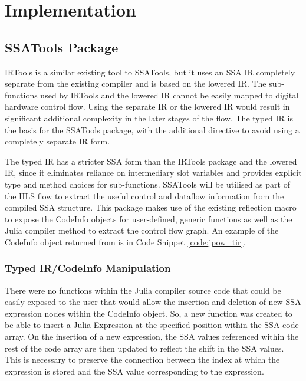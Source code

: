 \chapter{Implementation}

\section{SSATools Package}
IRTools \cite{julia_irtools} is a similar existing tool to SSATools, but it uses an SSA IR completely separate from the existing compiler and is based on the lowered IR. The sub-functions used by IRTools and the lowered IR cannot be easily mapped to digital hardware control flow. Using the separate IR or the lowered IR would result in significant additional complexity in the later stages of the flow. The typed IR is the basis for the SSATools package, with the additional directive to avoid using a completely separate IR form.

The typed IR has a stricter SSA form than the IRTools package and the lowered IR, since it eliminates reliance on intermediary slot variables and provides explicit type and method choices for sub-functions. SSATools will be utilised as part of the HLS flow to extract the useful control and dataflow information from the compiled SSA structure. This package makes use of the existing reflection macro  to expose the CodeInfo objects for user-defined, generic functions as well as the Julia compiler method  to extract the control flow graph. An example of the CodeInfo object returned from  is in Code Snippet \ref{code:jpow_tir}.

\subsection{Typed IR/CodeInfo Manipulation}
There were no functions within the Julia compiler source code that could be easily exposed to the user that would allow the insertion and deletion of new SSA expression nodes within the CodeInfo object. So, a new function was created to be able to insert a Julia Expression at the specified position within the SSA code array. On the insertion of a new expression, the SSA values referenced within the rest of the code array are then updated to reflect the shift in the SSA values. This is necessary to preserve the connection between the index at which the expression is stored and the SSA value corresponding to the expression.

